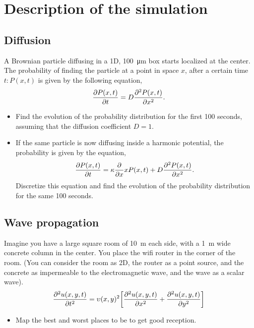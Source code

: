 \documentclass[main.tex]{subfiles}
\begin{document}
\section{Description of the simulation}

\subsection{Diffusion}

A Brownian particle diffusing in a 1D, \SI{100}{\micro\meter} box starts localized at the center.
The probability of finding the particle at a point in space $x$, after a certain time $t:P(x,t)$  is given by the following equation,
\begin{gather}
    \pdv{P\qty(x,t)}{t} = D\pdv[2]{P(x,t)}{x}\label{eqn8:difussion}.
\end{gather}

\begin{itemize}
    \item Find the evolution of the probability distribution for the first \num{100} seconds, assuming that the diffusion coefficient $D=1$.
    \item If the same particle is now diffusing inside a harmonic potential, the probability is given by the equation,
    \begin{gather}
        \pdv{P\qty(x,t)}{t} = \kappa\pdv{x}xP\qty(x,t) + D\pdv[2]{P(x,t)}{x}\label{eqn8:harmonicDiffusion}.
    \end{gather}
    Discretize this equation and find the evolution of the probability distribution for the same \num{100} seconds.
\end{itemize}

\subsection{Wave propagation}
 Imagine you have a large square room of \SI{10}{\meter} each side, with a \SI{1}{\meter} wide concrete column in the center.
 You place the wifi router in the corner of the room. 
 (You can consider the room as 2D, the router as a point source, and the concrete as impermeable to the electromagnetic wave, and the wave as a scalar wave).
\begin{gather}
    \pdv[2]{u(x,y,t)}{t} = \upsilon(x,y)^2\qty[\pdv[2]{u(x,y,t)}{x} + \pdv[2]{u(x,y,t)}{y}]\label{eqn8:waveEquation}
\end{gather}

 \begin{itemize}
     \item Map the best and worst places to be to get good reception.
 \end{itemize}
\end{document}
